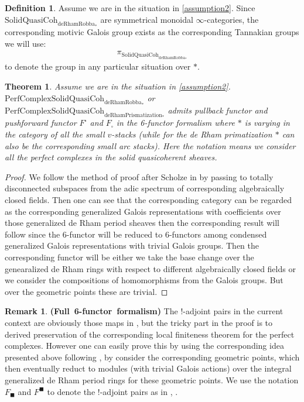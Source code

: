 \documentclass[12pt]{article}
\newtheorem{theorem}{Theorem}
\theoremstyle{definition}
\newtheorem{remark}{Remark}
\newtheorem{definition}{Definition}
\begin{document}
\begin{definition}
Assume we are in the situation in \cref{assumption2}. Since $\mathrm{SolidQuasiCoh}_{\mathrm{deRhamRobba}_*}$ are symmetrical monoidal $\infty$-categories, the corresponding motivic Galois group exists as the corresponding Tannakian groups we will use:
\begin{align}
\pi_{\mathrm{SolidQuasiCoh}_{\mathrm{deRhamRobba}_*}}
\end{align}
to denote the group in any particular situation over $*$.
\end{definition}


\begin{theorem}
Assume we are in the situation in \cref{assumption2}. $\mathrm{PerfComplex}\mathrm{SolidQuasiCoh}_{\mathrm{deRhamRobba}_*}$ or $\mathrm{PerfComplex}\mathrm{SolidQuasiCoh}_{\mathrm{deRhamPrismatization}_*}$ admits pullback functor and pushforward functor $F^\square$ and $F_\square$ in the 6-functor formalism where $*$ is varying in the category of all the small $v$-stacks (while for the de Rham primatization $*$ can also be the corresponding small arc stacks). Here the notation means we consider all the perfect complexes in the solid quasicoherent sheaves. 
\end{theorem}

\begin{proof}
We follow the method of proof after Scholze in \cite{1S5} by passing to totally disconnected subspaces from the adic spectrum of corresponding algebraically closed fields. Then one can see that the corresponding category can be regarded as the corresponding generalized Galois representations with coefficients over those generalized de Rham period sheaves then the corresponding result will follow since the 6-functor will be reduced to 6-functors among condensed generalized Galois representations with trivial Galois groups. Then the corresponding functor will be either we take the base change over the genearalized de Rham rings with respect to different algebraically closed fields or we consider the compositions of homomorphisms from the Galois groups. But over the geometric points these are trivial. 
\end{proof}


\begin{remark} \mbox{\textbf{(Full 6-functor formalism)}}
The $!$-adjoint pairs in the current context are obviously those maps in \cite{1S5}, \cite{1S6} but the tricky part in the proof is to derived preservation of the corresponding local finiteness theorem for the perfect complexes. However one can easily prove this by using the corresponding idea presented above following \cite{1S5}, \cite{1S6} by consider the corresponding geometric points, which then eventually reduct to modules (with trivial Galois actions) over the integral generalized de Rham period rings for these geometric points. We use the notation $F_\blacksquare$ and $F^\blacksquare$ to denote the $!$-adjoint pairs as in \cite{1S5}, \cite{1S6}.
\end{remark}
\end{document}
